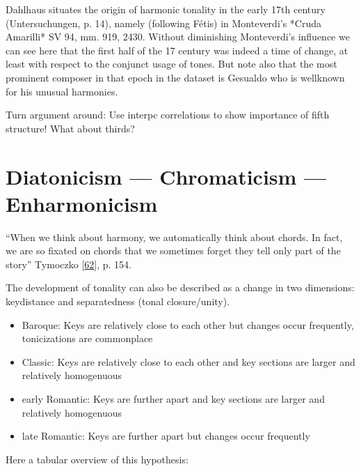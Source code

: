 \documentclass[letterpaper,10pt,english]{sphinxmanual}
\begin{document}
\sphinxAtStartPar
Dahlhaus situates the origin of harmonic tonality in the early 17th
century (Untersuchungen, p. 14), namely (following Fétis) in
Monteverdi’s *Cruda Amarilli* SV 94, mm. 9\sphinxhyphen{}19, 24\sphinxhyphen{}30. Without
diminishing Monteverdi’s influence we can see here that the first half
of the 17 century was indeed a time of change, at least with respect to
the conjunct usage of tones. But note also that the most prominent
composer in that epoch in the dataset is Gesualdo who is well\sphinxhyphen{}known for
his unusual harmonies.

\sphinxAtStartPar
Turn argument around: Use inter\sphinxhyphen{}pc correlations to show importance of
fifth structure! What about thirds?


\chapter{Diatonicism — Chromaticism — Enharmonicism}
\label{\detokenize{diatonicism_chromaticism:diatonicism-chromaticism-enharmonicism}}\label{\detokenize{diatonicism_chromaticism::doc}}
\sphinxAtStartPar
“When we think about harmony, we automatically think about chords. In
fact, we are so fixated on chords that we sometimes forget they tell
only part of the story” Tymoczko {[}\hyperlink{cite.8_bibliography:id59}{62}{]}, p. 154.

\sphinxAtStartPar
The development of tonality can also be described as a change in two
dimensions: key\sphinxhyphen{}distance and separatedness (tonal closure/unity).
\begin{itemize}
\item {} 
\sphinxAtStartPar
Baroque: Keys are relatively close to each other but changes occur
frequently, tonicizations are commonplace

\item {} 
\sphinxAtStartPar
Classic: Keys are relatively close to each other and key sections are
larger and relatively homogenuous

\item {} 
\sphinxAtStartPar
early Romantic: Keys are further apart and key sections are larger
and relatively homogenuous

\item {} 
\sphinxAtStartPar
late Romantic: Keys are further apart but changes occur frequently

\end{itemize}

\sphinxAtStartPar
Here a tabular overview of this hypothesis:
\end{document}
